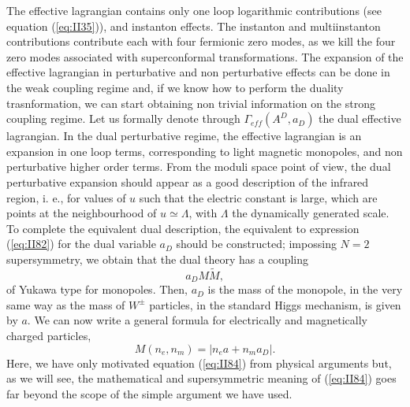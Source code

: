 The effective lagrangian contains only one loop logarithmic
contributions (see equation (\ref{eq:II35})), and instanton
effects. The instanton and multiinstanton contributions
contribute each with four fermionic zero modes, as we kill the
four zero modes associated with superconformal transformations.
The expansion of the effective lagrangian in perturbative and non
perturbative effects can be done in the weak coupling regime and,
if we know how to perform the duality trasnformation, we can
start obtaining non trivial information on the strong coupling
regime. Let us formally denote through $\Gamma_{eff}(A^D,a_D)$ the dual
effective lagrangian. In the dual perturbative regime, the
effective lagrangian is an expansion in one loop terms,
corresponding to light magnetic monopoles, and non perturbative
higher order terms. From the moduli space point of view, the dual
perturbative expansion should appear as a good description of the
infrared region, i. e., for values of $u$ such that the
electric constant is large, which are points at the neighbourhood
of $u \simeq \Lambda$, with $\Lambda$ the dynamically generated
scale. To complete the equivalent dual description, the
equivalent to expression (\ref{eq:II82}) for the dual variable $a_D$
should be constructed; impossing $N\!=\!2$
supersymmetry, we obtain that the dual theory has a coupling 
\begin{equation}
a_D M\tilde{M},
\label{eq:II83}
\end{equation}
of Yukawa type for monopoles. Then, $a_D$ is the mass of the
monopole, in the very same way as the mass of $W^{\pm}$
particles, in the standard Higgs mechanism, is given by $a$. We
can now write a general formula for electrically and magnetically
charged particles,
\begin{equation}
M(n_e,n_m)= |n_e a+n_m a_D|.
\label{eq:II84}
\end{equation}
Here, we have only motivated equation (\ref{eq:II84}) from
physical arguments but, as we will see, the mathematical and
supersymmetric meaning of (\ref{eq:II84}) goes far beyond the
scope of the simple argument we have used.
  
